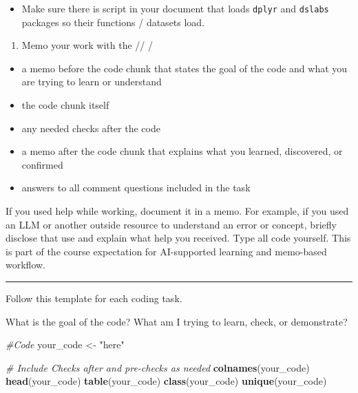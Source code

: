 \documentclass[
]{article}
\newenvironment{Shaded}{\begin{snugshade}}{\end{snugshade}}
\newcommand{\CommentTok}[1]{\textcolor[rgb]{0.56,0.35,0.01}{\textit{#1}}}
\newcommand{\FunctionTok}[1]{\textcolor[rgb]{0.13,0.29,0.53}{\textbf{#1}}}
\newcommand{\NormalTok}[1]{#1}
\newcommand{\OtherTok}[1]{\textcolor[rgb]{0.56,0.35,0.01}{#1}}
\newcommand{\StringTok}[1]{\textcolor[rgb]{0.31,0.60,0.02}{#1}}
\providecommand{\tightlist}{%
  \setlength{\itemsep}{0pt}\setlength{\parskip}{0pt}}
\begin{document}
\begin{itemize}
\tightlist
\item
  Make sure there is script in your document that loads \texttt{dplyr}
  and \texttt{dslabs} packages so their functions / datasets load.
\end{itemize}

\begin{enumerate}
\def\labelenumi{\arabic{enumi}.}
\setcounter{enumi}{3}
\tightlist
\item
  Memo your work with the // /
\end{enumerate}

\begin{itemize}
\item
  a memo before the code chunk that states the goal of the code and what
  you are trying to learn or understand
\item
  the code chunk itself
\item
  any needed checks after the code
\item
  a memo after the code chunk that explains what you learned,
  discovered, or confirmed
\item
  answers to all comment questions included in the task
\end{itemize}

If you used help while working, document it in a memo. For example, if
you used an LLM or another outside resource to understand an error or
concept, briefly disclose that use and explain what help you received.
Type all code yourself. This is part of the course expectation for
AI-supported learning and memo-based workflow.

\begin{center}\rule{0.5\linewidth}{0.5pt}\end{center}

Follow this template for each coding task.

What is the goal of the code? What am I trying to learn, check, or
demonstrate?

\begin{Shaded}
\begin{Highlighting}[]
\CommentTok{\#Code }
\NormalTok{your\_code }\OtherTok{\textless{}{-}} \StringTok{"here"}
\end{Highlighting}
\end{Shaded}

\begin{Shaded}
\begin{Highlighting}[]
\CommentTok{\#  Include Checks after and pre{-}checks as needed}
\FunctionTok{colnames}\NormalTok{(your\_code)}
\FunctionTok{head}\NormalTok{(your\_code)}
\FunctionTok{table}\NormalTok{(your\_code)}
\FunctionTok{class}\NormalTok{(your\_code)}
\FunctionTok{unique}\NormalTok{(your\_code)}
\end{Highlighting}
\end{Shaded}
\end{document}

